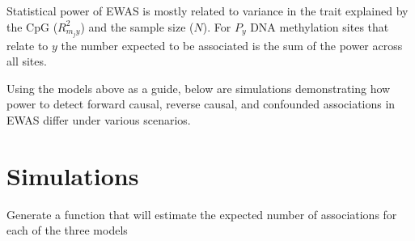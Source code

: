 \documentclass[
]{article}
\begin{document}
Statistical power of EWAS is mostly related to variance in the trait explained by the CpG (\(R^2_{m_jy}\)) and the sample size (\(N\)). For \(P_y\) DNA methylation sites that relate to \(y\) the number expected to be associated is the sum of the power across all sites.

Using the models above as a guide, below are simulations demonstrating how power to detect forward causal, reverse causal, and confounded associations in EWAS differ under various scenarios.

\newpage

\hypertarget{simulations}{%
\section{Simulations}\label{simulations}}

Generate a function that will estimate the expected number of associations for each of the three models
\end{document}
